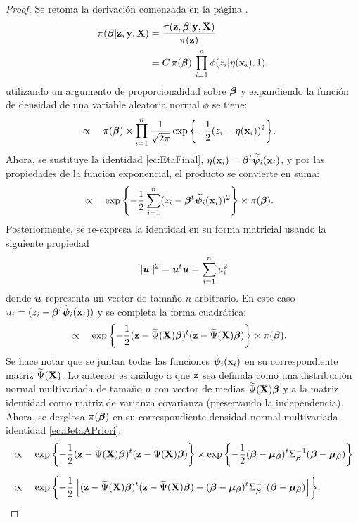\documentclass[../../Main/Main.tex]{subfiles}
\begin{document}
\begin{proof}
Se retoma la derivación comenzada en la página \pageref{ec:DefProbaCond}.
\begin{align*}
	\pi(\bm{\beta}|\mathbf{z},\mathbf{y},\mathbf{X})
	& = \dfrac{\pi(\mathbf{z}, \bm{\beta}| \mathbf{y}, \mathbf{X})}{\pi(\mathbf{z})} \\
	& = C \,\pi(\bm{\beta}) \, \prod_{i = 1}^n\phi(z_i|\eta(\mathbf{x}_i),1),
\end{align*}
utilizando un argumento de proporcionalidad sobre $\bm{\beta}$ y expandiendo la función de densidad de una variable aleatoria normal $\phi$ se tiene:
\begin{align*}
	& \propto \quad \pi(\bm{\beta})\times \prod_{i = 1}^n \dfrac{1}{\sqrt{2\pi}}\exp{\left\{ -\dfrac{1}{2}(z_i - \eta(\mathbf{x}_i))^2 \right\}}.
\end{align*}
Ahora, se sustituye la identidad \eqref{ec:EtaFinal}, $\eta(\mathbf{x}_i) = \bm{\beta}^t\widetilde{\bm{\psi}}_i(\mathbf{x}_i)$, y por las propiedades de la función exponencial, el producto se convierte en suma:
\begin{align*}
	& \propto \quad  \exp{\left\{ -\dfrac{1}{2}\sum_{i = 1}^n(z_i - \bm{\beta}^t\widetilde{\bm{\psi}}_i(\mathbf{x}_i))^2 \right\}}\times \pi(\bm{\beta}).
\end{align*}
Posteriormente, se re-expresa la identidad en su forma matricial usando la siguiente propiedad $$||\bm{u}||^2 = \bm{u}^t\bm{u} = \sum_{i = 1}^n u_i^2$$ donde $\bm{u}$ representa un vector de tamaño $n$ arbitrario. En este caso $u_i = (z_i - \bm{\beta}^t\widetilde{\bm{\psi}}_i(\mathbf{x}_i))$ y se completa la forma cuadrática:
\begin{align*}
	& \propto \quad  \exp{\left\{ -\dfrac{1}{2}(\mathbf{z}- \widetilde{\Psi}(\mathbf{X})\bm{\beta})^t(\mathbf{z}- \widetilde{\Psi}(\mathbf{X})\bm{\beta}) \right\}}\times \pi(\bm{\beta}).
\end{align*}
Se hace notar que se juntan todas las funciones $\widetilde{\bm{\psi}}_i(\mathbf{x}_i)$ en su correspondiente matriz $\widetilde{\Psi}(\mathbf{X})$. Lo anterior es análogo a que $\mathbf{z}$ sea definida como una distribución normal multivariada de tamaño $n$ con vector de medias $\widetilde{\Psi}(\mathbf{X}) \bm{\beta}$ y a la matriz identidad como matriz de varianza covarianza (preservando la independencia). Ahora, se desglosa $\pi(\bm{\beta})$ en su correspondiente densidad normal multivariada , identidad \eqref{ec:BetaAPriori}:
\begin{align}
	& \propto \quad \exp{\left\{ -\dfrac{1}{2}(\zsn - \tildePsi \betabf)^t(\zsn - \tildePsi\betabf) \right\}}\times \exp{\left\{ -\dfrac{1}{2}(\betabf - \mubeta)^t\Sigmabeta^{-1}(\betabf - \mubeta) \right\}} \nonumber\\[6pt]
	& \propto \quad \exp{\left\{ -\dfrac{1}{2} \left[ (\zsn - \tildePsi \betabf)^t(\zsn - \tildePsi\betabf) + (\betabf - \mubeta)^t\Sigmabeta^{-1}(\betabf - \mubeta) \right]\right\}} \label{ec:DerivacionNormal1}.

\end{align}
\end{proof}
\end{document}
